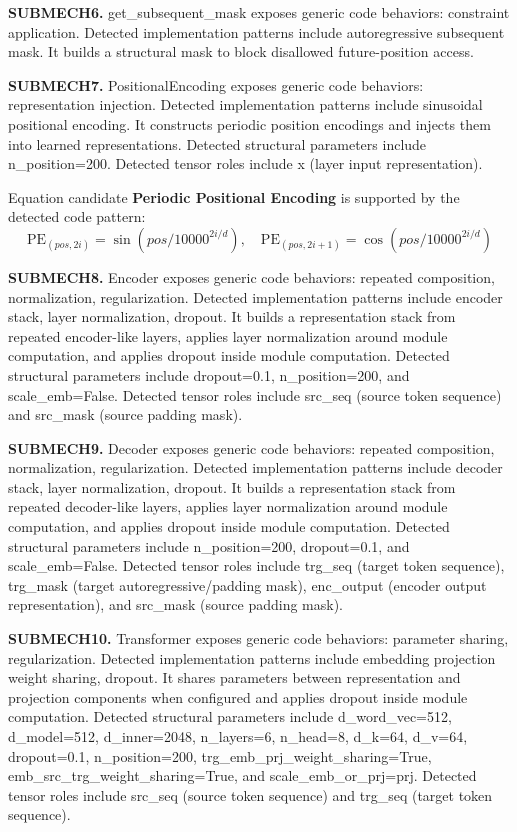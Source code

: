 \textbf{SUBMECH6.} get\_subsequent\_mask exposes generic code behaviors: constraint application. Detected implementation patterns include autoregressive subsequent mask. It builds a structural mask to block disallowed future-position access.

\textbf{SUBMECH7.} PositionalEncoding exposes generic code behaviors: representation injection. Detected implementation patterns include sinusoidal positional encoding. It constructs periodic position encodings and injects them into learned representations. Detected structural parameters include n\_position=200. Detected tensor roles include x (layer input representation).

Equation candidate \textbf{Periodic Positional Encoding} is supported by the detected code pattern:
\[
\mathrm{PE}_{(pos,2i)}=\sin(pos/10000^{2i/d}),\quad \mathrm{PE}_{(pos,2i+1)}=\cos(pos/10000^{2i/d})
\]

\textbf{SUBMECH8.} Encoder exposes generic code behaviors: repeated composition, normalization, regularization. Detected implementation patterns include encoder stack, layer normalization, dropout. It builds a representation stack from repeated encoder-like layers, applies layer normalization around module computation, and applies dropout inside module computation. Detected structural parameters include dropout=0.1, n\_position=200, and scale\_emb=False. Detected tensor roles include src\_seq (source token sequence) and src\_mask (source padding mask).

\textbf{SUBMECH9.} Decoder exposes generic code behaviors: repeated composition, normalization, regularization. Detected implementation patterns include decoder stack, layer normalization, dropout. It builds a representation stack from repeated decoder-like layers, applies layer normalization around module computation, and applies dropout inside module computation. Detected structural parameters include n\_position=200, dropout=0.1, and scale\_emb=False. Detected tensor roles include trg\_seq (target token sequence), trg\_mask (target autoregressive/padding mask), enc\_output (encoder output representation), and src\_mask (source padding mask).

\textbf{SUBMECH10.} Transformer exposes generic code behaviors: parameter sharing, regularization. Detected implementation patterns include embedding projection weight sharing, dropout. It shares parameters between representation and projection components when configured and applies dropout inside module computation. Detected structural parameters include d\_word\_vec=512, d\_model=512, d\_inner=2048, n\_layers=6, n\_head=8, d\_k=64, d\_v=64, dropout=0.1, n\_position=200, trg\_emb\_prj\_weight\_sharing=True, emb\_src\_trg\_weight\_sharing=True, and scale\_emb\_or\_prj=prj. Detected tensor roles include src\_seq (source token sequence) and trg\_seq (target token sequence).

